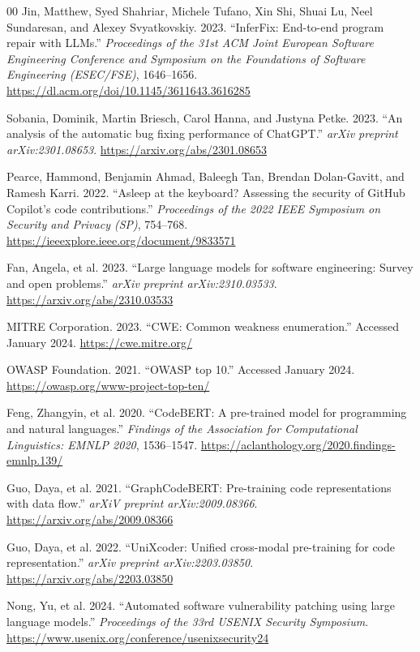 \documentclass[conference]{IEEEtran}
\begin{document}
\begin{thebibliography}{00}
Jin, Matthew, Syed Shahriar, Michele Tufano, Xin Shi, Shuai Lu, Neel Sundaresan, and Alexey Svyatkovskiy. 2023. ``InferFix: End-to-end program repair with LLMs.'' \textit{Proceedings of the 31st ACM Joint European Software Engineering Conference and Symposium on the Foundations of Software Engineering (ESEC/FSE)}, 1646--1656. \url{https://dl.acm.org/doi/10.1145/3611643.3616285}

Sobania, Dominik, Martin Briesch, Carol Hanna, and Justyna Petke. 2023. ``An analysis of the automatic bug fixing performance of ChatGPT.'' \textit{arXiv preprint arXiv:2301.08653}. \url{https://arxiv.org/abs/2301.08653}

Pearce, Hammond, Benjamin Ahmad, Baleegh Tan, Brendan Dolan-Gavitt, and Ramesh Karri. 2022. ``Asleep at the keyboard? Assessing the security of GitHub Copilot's code contributions.'' \textit{Proceedings of the 2022 IEEE Symposium on Security and Privacy (SP)}, 754--768. \url{https://ieeexplore.ieee.org/document/9833571}

Fan, Angela, et al. 2023. ``Large language models for software engineering: Survey and open problems.'' \textit{arXiv preprint arXiv:2310.03533}. \url{https://arxiv.org/abs/2310.03533}

MITRE Corporation. 2023. ``CWE: Common weakness enumeration.'' Accessed January 2024. \url{https://cwe.mitre.org/}

OWASP Foundation. 2021. ``OWASP top 10.'' Accessed January 2024. \url{https://owasp.org/www-project-top-ten/}

Feng, Zhangyin, et al. 2020. ``CodeBERT: A pre-trained model for programming and natural languages.'' \textit{Findings of the Association for Computational Linguistics: EMNLP 2020}, 1536--1547. \url{https://aclanthology.org/2020.findings-emnlp.139/}

Guo, Daya, et al. 2021. ``GraphCodeBERT: Pre-training code representations with data flow.'' \textit{arXiV preprint arXiv:2009.08366}. \url{https://arxiv.org/abs/2009.08366}

Guo, Daya, et al. 2022. ``UniXcoder: Unified cross-modal pre-training for code representation.'' \textit{arXiv preprint arXiv:2203.03850}. \url{https://arxiv.org/abs/2203.03850}

Nong, Yu, et al. 2024. ``Automated software vulnerability patching using large language models.'' \textit{Proceedings of the 33rd USENIX Security Symposium}. \url{https://www.usenix.org/conference/usenixsecurity24}


\end{thebibliography}
\end{document}

